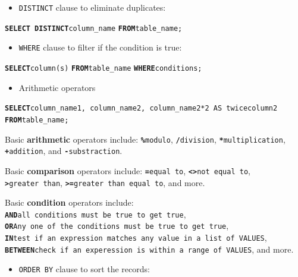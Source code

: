 \documentclass[
  letterpaper,
  DIV=11,
  numbers=noendperiod]{scrreprt}
\providecommand{\tightlist}{%
  \setlength{\itemsep}{0pt}\setlength{\parskip}{0pt}}\usepackage{longtable,booktabs,array}
\begin{document}
\begin{itemize}
\tightlist
\item
  \texttt{DISTINCT} clause to eliminate duplicates:
\end{itemize}

\textbf{\texttt{SELECT\ DISTINCT}}\texttt{column\_name}
\textbf{\texttt{FROM}}\texttt{table\_name;}

\begin{itemize}
\tightlist
\item
  \texttt{WHERE} clause to filter if the condition is true:
\end{itemize}

\textbf{\texttt{SELECT}}\texttt{column(s)}
\textbf{\texttt{FROM}}\texttt{table\_name}
\textbf{\texttt{WHERE}}\texttt{conditions;}

\begin{itemize}
\tightlist
\item
  Arithmetic operators
\end{itemize}

\textbf{\texttt{SELECT}}\texttt{column\_name1,\ column\_name2,\ column\_name2*2\ AS\ \textquotesingle{}twicecolumn2\textquotesingle{}}
\textbf{\texttt{FROM}}\texttt{table\_name;}

Basic \textbf{arithmetic} operators include:
\textbf{\texttt{\%}}\texttt{modulo},
\textbf{\texttt{/}}\texttt{division},
\textbf{\texttt{*}}\texttt{multiplication},
\textbf{\texttt{+}}\texttt{addition}, and
\textbf{\texttt{-}}\texttt{substraction}.

Basic \textbf{comparison} operators include:
\textbf{\texttt{=}}\texttt{equal\ to},
\textbf{\texttt{\textless{}\textgreater{}}}\texttt{not\ equal\ to},
\textbf{\texttt{\textgreater{}}}\texttt{greater\ than},
\textbf{\texttt{\textgreater{}=}}\texttt{greater\ than\ equal\ to}, and
more.

Basic \textbf{condition} operators include:
\textbf{\texttt{AND}}\texttt{all\ conditions\ must\ be\ true\ to\ get\ true},
\textbf{\texttt{OR}}\texttt{Any\ one\ of\ the\ conditions\ must\ be\ true\ to\ get\ true},
\textbf{\texttt{IN}}\texttt{test\ if\ an\ expression\ matches\ any\ value\ in\ a\ list\ of\ VALUES},
\textbf{\texttt{BETWEEN}}\texttt{check\ if\ an\ experession\ is\ within\ a\ range\ of\ VALUES},
and more.

\begin{itemize}
\tightlist
\item
  \texttt{ORDER\ BY} clause to sort the records:
\end{itemize}
\end{document}
